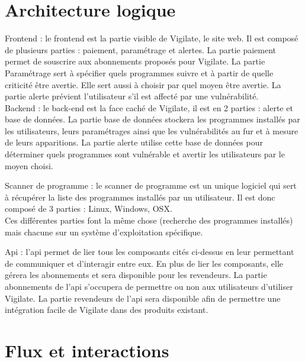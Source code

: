 \section{Architecture logique}
Frontend : le frontend est la partie visible de Vigilate, le site web.
Il est composé de plusieurs parties : paiement, paramétrage et alertes.
La partie paiement permet de souscrire aux abonnements proposés pour Vigilate.
La partie Paramétrage sert à spécifier quels programmes suivre et à partir de quelle criticité être avertie. Elle sert aussi à choisir par quel moyen être avertie.
La partie alerte prévient l'utilisateur s'il est affecté par une vulnérabilité.\\

Backend : le back-end est la face caché de Vigilate, il est en 2 parties : alerte et base de données.
La partie base de données stockera les programmes installés par les utilisateurs, leurs paramétrages ainsi que les vulnérabilités au fur et à mesure de leurs apparitions.
La partie alerte utilise cette base de données pour déterminer quels programmes sont vulnérable et avertir les utilisateurs par le moyen choisi.

Scanner de programme : le scanner de programme est un unique logiciel qui sert à récupérer la liste des programmes installés par un utilisateur. Il est donc composé de 3 parties : Linux, Windows, OSX.\\
Ces différentes parties font la même chose (recherche des programmes installés) mais chacune sur un système d'exploitation spécifique.

Api : l'api permet de lier tous les composants cités ci-dessus en leur permettant de communiquer et d'interagir entre eux. En plus de lier les composants, elle gérera les abonnements et sera disponible pour les revendeurs.
La partie abonnements de l'api s'occupera de permettre ou non aux utilisateurs d'utiliser Vigilate.
La partie revendeurs de l'api sera disponible afin de permettre une intégration facile de Vigilate dans des produits existant.
\section{Flux et interactions}

